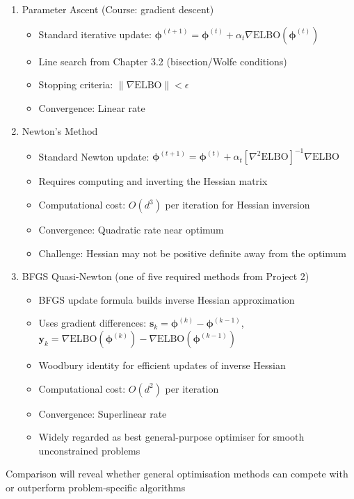 \documentclass[11pt]{article}
\newcommand{\ELBO}{\text{ELBO}}
\begin{document}
\begin{enumerate}[leftmargin=*]
\item Parameter Ascent (Course: gradient descent)
\begin{itemize}
\item Standard iterative update: $\bm{\phi}^{(t+1)} = \bm{\phi}^{(t)} + \alpha_t \nabla \ELBO(\bm{\phi}^{(t)})$
\item Line search from Chapter 3.2 (bisection/Wolfe conditions)
\item Stopping criteria: $\|\nabla \ELBO\| < \epsilon$
\item Convergence: Linear rate
\end{itemize}

\item Newton's Method   
\begin{itemize}
\item Standard Newton update: $\bm{\phi}^{(t+1)} = \bm{\phi}^{(t)} + \alpha_t [\nabla^2 \ELBO]^{-1} \nabla \ELBO$
\item Requires computing and inverting the Hessian matrix
\item Computational cost: $O(d^3)$ per iteration for Hessian inversion
\item Convergence: Quadratic rate near optimum
\item Challenge: Hessian may not be positive definite away from the optimum
\end{itemize}

\item BFGS Quasi-Newton (one of five required methods from Project 2)
\begin{itemize}
\item BFGS update formula builds inverse Hessian approximation
\item Uses gradient differences: $\bm{s}_k = \bm{\phi}^{(k)} - \bm{\phi}^{(k-1)}$, $\bm{y}_k = \nabla \ELBO(\bm{\phi}^{(k)}) - \nabla \ELBO(\bm{\phi}^{(k-1)})$
\item Woodbury identity for efficient updates of inverse Hessian
\item Computational cost: $O(d^2)$ per iteration
\item Convergence: Superlinear rate
\item Widely regarded as best general-purpose optimiser for smooth unconstrained problems
\end{itemize}
\end{enumerate}


Comparison will reveal whether general optimisation methods can compete with or outperform problem-specific algorithms
\end{document}
